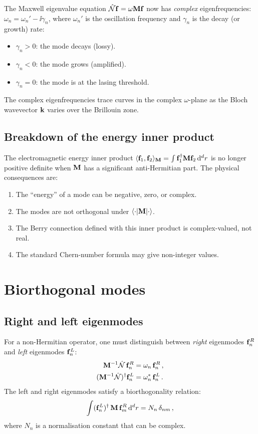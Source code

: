 The Maxwell eigenvalue equation $\hat{\mathcal{N}}\mathbf{f}=\omega\mathbf{M}\mathbf{f}$
now has \emph{complex} eigenfrequencies:
$\omega_n=\omega_n'-\ii\gamma_n$, where $\omega_n'$ is the oscillation
frequency and $\gamma_n$ is the decay (or growth) rate:
\begin{itemize}
  \item $\gamma_n>0$: the mode decays (lossy).
  \item $\gamma_n<0$: the mode grows (amplified).
  \item $\gamma_n=0$: the mode is at the lasing threshold.
\end{itemize}

The complex eigenfrequencies trace curves in the complex $\omega$-plane
as the Bloch wavevector $\mathbf{k}$ varies over the Brillouin zone.

\subsection{Breakdown of the energy inner product}
\label{sec:ch17-breakdown}

The electromagnetic energy inner product
$\langle \mathbf{f}_1 , \mathbf{f}_2 \rangle_{\mathbf{M}}=\int\mathbf{f}_1^\dagger\mathbf{M}\mathbf{f}_2
\,\mathrm{d}^d r$ is no longer positive definite when $\mathbf{M}$ has a
significant anti-Hermitian part.  The physical consequences are:
\begin{enumerate}
  \item The ``energy'' of a mode can be negative, zero, or complex.
  \item The modes are not orthogonal under $\langle\cdot|\mathbf{M}|\cdot\rangle$.
  \item The Berry connection defined with this inner product is
  complex-valued, not real.
  \item The standard Chern-number formula may give non-integer values.
\end{enumerate}

\section{Biorthogonal modes}
\label{sec:ch17-biorthogonal} \cite{kunst2018biorthogonal}

\subsection{Right and left eigenmodes}
\label{sec:ch17-right-left}

For a non-Hermitian operator, one must distinguish between \emph{right}
eigenmodes $\mathbf{f}_n^R$ and \emph{left} eigenmodes $\mathbf{f}_n^L$:
\begin{align}
  \mathbf{M}^{-1}\hat{\mathcal{N}}\,\mathbf{f}_n^R &= \omega_n\,\mathbf{f}_n^R\,,
  \label{eq:ch17-right}\\
  (\mathbf{M}^{-1}\hat{\mathcal{N}})^\dagger\mathbf{f}_n^L &= \omega_n^*\,\mathbf{f}_n^L\,.
  \label{eq:ch17-left}
\end{align}
The left and right eigenmodes satisfy a biorthogonality relation:
\begin{equation}\label{eq:ch17-biorthogonal}
  \int(\mathbf{f}_n^L)^\dagger\,\mathbf{M}\,\mathbf{f}_m^R\,\mathrm{d}^d r
  = N_n\,\delta_{nm}\,,
\end{equation}
where $N_n$ is a normalisation constant that can be complex.

